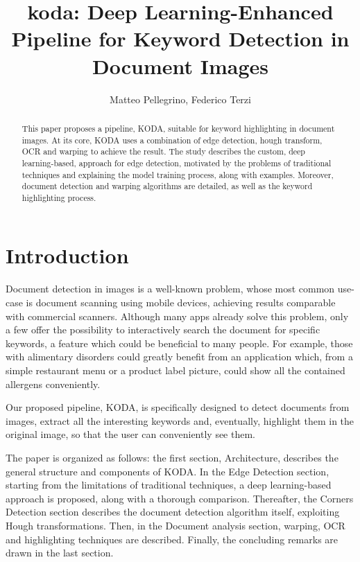 \documentclass[a4paper]{article}
\title{koda: Deep Learning-Enhanced Pipeline for Keyword Detection in Document Images}
\author{Matteo Pellegrino, Federico Terzi}
\begin{document}
\maketitle

\begin{abstract}
This paper proposes a pipeline, KODA, suitable for keyword highlighting in document images. At its core, KODA uses a combination of edge detection, hough transform, OCR and warping to achieve the result. The study describes the custom, deep learning-based, approach for edge detection, motivated by the problems of traditional techniques and explaining the model training process, along with examples. Moreover, document detection and warping algorithms are detailed, as well as the keyword highlighting process.
\end{abstract}

\begingroup\let\clearpage\relax
\vspace{2cm}
\tableofcontents \endgroup

\section{Introduction}
Document detection in images is a well-known problem, whose most common use-case is document scanning using mobile devices, achieving results comparable with commercial scanners. Although many apps already solve this problem, only a few offer the possibility to interactively search the document for specific keywords, a feature which could be beneficial to many people. For example, those with alimentary disorders could greatly benefit from an application which, from a simple restaurant menu or a product label picture, could show all the contained allergens conveniently.

Our proposed pipeline, KODA, is specifically designed to detect documents from images, extract all the interesting keywords and, eventually, highlight them in the original image, so that the user can conveniently see them.

The paper is organized as follows: the first section, Architecture, describes the general structure and components of KODA. In the Edge Detection section, starting from the limitations of traditional techniques, a deep learning-based approach is proposed, along with a thorough comparison. Thereafter, the Corners Detection section describes the document detection algorithm itself, exploiting Hough transformations. Then, in the Document analysis section, warping, OCR and highlighting techniques are described. Finally, the concluding remarks are drawn in the last section.
\end{document}
